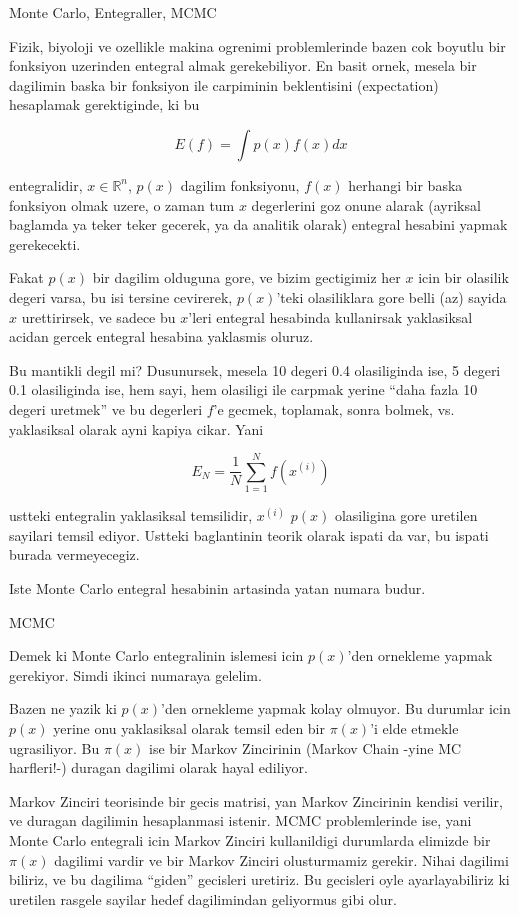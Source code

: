 \documentclass[12pt,fleqn]{article}\usepackage{../common}
\begin{document}
Monte Carlo, Entegraller, MCMC

Fizik, biyoloji ve ozellikle makina ogrenimi problemlerinde bazen cok
boyutlu bir fonksiyon uzerinden entegral almak gerekebiliyor. En basit
ornek, mesela bir dagilimin baska bir fonksiyon ile carpiminin beklentisini
(expectation) hesaplamak gerektiginde, ki bu

\[ E(f) = \int p(x)f(x)dx \]

entegralidir, $x \in \mathbb{R}^n$, $p(x)$ dagilim fonksiyonu, $f(x)$ herhangi bir
baska fonksiyon olmak uzere, o zaman tum $x$ degerlerini goz onune alarak
(ayriksal baglamda ya teker teker gecerek, ya da analitik olarak) entegral
hesabini yapmak gerekecekti.

Fakat $p(x)$ bir dagilim olduguna gore, ve bizim gectigimiz her $x$ icin
bir olasilik degeri varsa, bu isi tersine cevirerek, $p(x)$'teki
olasiliklara gore belli (az) sayida $x$ urettirirsek, ve sadece bu $x$'leri
entegral hesabinda kullanirsak yaklasiksal acidan gercek entegral hesabina
yaklasmis oluruz. 

Bu mantikli degil mi? Dusunursek, mesela 10 degeri 0.4 olasiliginda ise, 5
degeri 0.1 olasiliginda ise, hem sayi, hem olasiligi ile carpmak yerine
``daha fazla 10 degeri uretmek'' ve bu degerleri $f$'e gecmek, toplamak,
sonra bolmek, vs. yaklasiksal olarak ayni kapiya cikar. Yani

\[ E_N = \frac{1}{N}\sum_{1=1}^N f(x^{(i)}) \]

ustteki entegralin yaklasiksal temsilidir, $x^{(i)}$ $p(x)$ olasiligina
gore uretilen sayilari temsil ediyor. Ustteki baglantinin teorik olarak
ispati da var, bu ispati burada vermeyecegiz. 

Iste Monte Carlo entegral hesabinin artasinda yatan numara budur. 

MCMC

Demek ki Monte Carlo entegralinin islemesi icin $p(x)$'den ornekleme yapmak
gerekiyor. Simdi ikinci numaraya gelelim. 

Bazen ne yazik ki $p(x)$'den ornekleme yapmak kolay olmuyor. Bu durumlar
icin $p(x)$ yerine onu yaklasiksal olarak temsil eden bir $\pi(x)$'i elde
etmekle ugrasiliyor. Bu $\pi(x)$ ise bir Markov Zincirinin (Markov Chain
-yine MC harfleri!-) duragan dagilimi olarak hayal ediliyor. 

Markov Zinciri teorisinde bir gecis matrisi, yan Markov Zincirinin kendisi
verilir, ve duragan dagilimin hesaplanmasi istenir. MCMC problemlerinde
ise, yani Monte Carlo entegrali icin Markov Zinciri kullanildigi durumlarda
elimizde bir $\pi(x)$ dagilimi vardir ve bir Markov Zinciri olusturmamiz
gerekir. Nihai dagilimi biliriz, ve bu dagilima ``giden'' gecisleri
uretiriz. Bu gecisleri oyle ayarlayabiliriz ki uretilen rasgele sayilar
hedef dagilimindan geliyormus gibi olur. 
\end{document}

